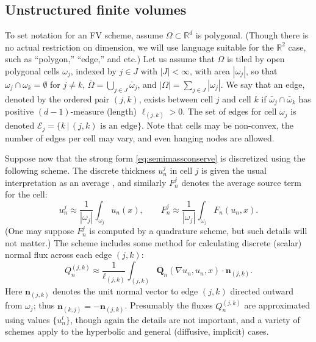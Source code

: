 \documentclass[final,onefignum]{siamart190516}
\newcommand\bn{\mathbf{n}}
\newcommand\bQ{\mathbf{Q}}
\newcommand{\grad}{\nabla}
\newcommand\RR{\mathbb{R}}
\begin{document}
\subsection{Unstructured finite volumes} \label{subsec:spacenotation}  To set notation for an FV scheme, assume $\Omega \subset \RR^d$ is polygonal.  (Though there is no actual restriction on dimension, we will use language suitable for the $\RR^2$ case, such as ``polygon,'' ``edge,'' and etc.)  Let us assume that $\Omega$ is tiled by open polygonal cells $\omega_j$, indexed by $j\in J$ with $|J|<\infty$, with area $|\omega_j|$, so that $\omega_j \cap \omega_k = \emptyset$ for $j\ne k$, $\bar\Omega = \bigcup_{j\in J} \bar \omega_j$, and $|\Omega| = \sum_{j\in J} |\omega_j|$.  We say that an edge, denoted by the ordered pair $(j,k)$, exists between cell $j$ and cell $k$ if $\bar\omega_j \cap \bar \omega_k$ has positive $(d-1)$-measure (length) $\ell_{(j,k)}>0$.  The set of edges for cell $\omega_j$ is denoted $\mathcal{E}_j=\{k\,\big|\,(j,k) \text{ is an edge}\}$.  Note that cells may be non-convex, the number of edges per cell may vary, and even hanging nodes are allowed.

Suppose now that the strong form \eqref{eq:semimassconserve} is discretized using the following scheme.  The discrete thickness $u_n^j$ in cell $j$ is given the usual interpretation as an average \cite{LeVeque2002}, and similarly $F_n^j$ denotes the average source term for the cell:
\begin{equation}
u_n^j \approx \frac{1}{|\omega_j|} \int_{\omega_j} u_n(x), \qquad F_n^j \approx \frac{1}{|\omega_j|} \int_{\omega_j} F_n(u_n,x).  \label{eq:fvthickness}
\end{equation}
(One may suppose $F_n^j$ is computed by a quadrature scheme, but such details will not matter.)  The scheme includes some method for calculating discrete (scalar) normal flux across each edge $(j,k)$:
\begin{equation}
Q_n^{(j,k)} \approx \frac{1}{\ell_{(j,k)}} \int_{(j,k)} \bQ_n(\grad u_n,u_n,x) \cdot \bn_{(j,k)}. \label{eq:fvflux}
\end{equation}
Here $\bn_{(j,k)}$ denotes the unit normal vector to edge $(j,k)$ directed outward from $\omega_j$; thus $\bn_{(k,j)} = -\bn_{(j,k)}$.  Presumably the fluxes $Q_n^{(j,k)}$ are approximated using values $\{u_n^l\}$, though again the details are not important, and a variety of schemes apply to the hyperbolic \cite{LeVeque2002} and general (diffusive, implicit) \cite{Morton2018} cases.
\end{document}
